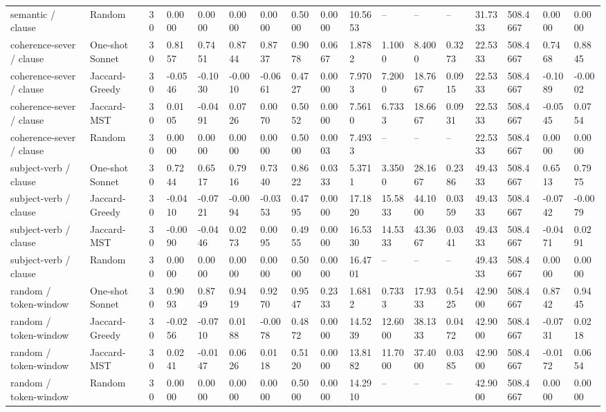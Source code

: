 \begin{table}[t]
{\begin{tabular}{lllllllllllllllll}
semantic / clause & Random & 30 & 0.0000 & 0.0000 & 0.0000 & 0.0000 & 0.5000 & 0.0000 & 10.5653 & -- & -- & -- & 31.7333 & 508.4667 & 0.0000 & 0.0000 \\
coherence-sever / clause & One-shot Sonnet & 30 & 0.8157 & 0.7451 & 0.8744 & 0.8737 & 0.9078 & 0.0667 & 1.8782 & 1.1000 & 8.4000 & 0.3273 & 22.5333 & 508.4667 & 0.7468 & 0.8845 \\
coherence-sever / clause & Jaccard-Greedy & 30 & -0.0546 & -0.1030 & -0.0010 & -0.0661 & 0.4727 & 0.0000 & 7.9703 & 7.2000 & 18.7667 & 0.0915 & 22.5333 & 508.4667 & -0.1089 & -0.0002 \\
coherence-sever / clause & Jaccard-MST & 30 & 0.0105 & -0.0491 & 0.0726 & 0.0070 & 0.5052 & 0.0000 & 7.5610 & 6.7333 & 18.6667 & 0.0931 & 22.5333 & 508.4667 & -0.0545 & 0.0754 \\
coherence-sever / clause & Random & 30 & 0.0000 & 0.0000 & 0.0000 & 0.0000 & 0.5000 & 0.0003 & 7.4933 & -- & -- & -- & 22.5333 & 508.4667 & 0.0000 & 0.0000 \\
subject-verb / clause & One-shot Sonnet & 30 & 0.7244 & 0.6517 & 0.7916 & 0.7340 & 0.8622 & 0.0333 & 5.3711 & 3.3500 & 28.1667 & 0.2386 & 49.4333 & 508.4667 & 0.6513 & 0.7975 \\
subject-verb / clause & Jaccard-Greedy & 30 & -0.0410 & -0.0721 & -0.0094 & -0.0353 & 0.4795 & 0.0000 & 17.1820 & 15.5833 & 44.1000 & 0.0359 & 49.4333 & 508.4667 & -0.0742 & -0.0079 \\
subject-verb / clause & Jaccard-MST & 30 & -0.0090 & -0.0446 & 0.0273 & 0.0095 & 0.4955 & 0.0000 & 16.5330 & 14.5333 & 43.3667 & 0.0341 & 49.4333 & 508.4667 & -0.0471 & 0.0291 \\
subject-verb / clause & Random & 30 & 0.0000 & 0.0000 & 0.0000 & 0.0000 & 0.5000 & 0.0000 & 16.4701 & -- & -- & -- & 49.4333 & 508.4667 & 0.0000 & 0.0000 \\
random / token-window & One-shot Sonnet & 30 & 0.9093 & 0.8749 & 0.9419 & 0.9270 & 0.9547 & 0.2333 & 1.6812 & 0.7333 & 17.9333 & 0.5425 & 42.9000 & 508.4667 & 0.8742 & 0.9445 \\
random / token-window & Jaccard-Greedy & 30 & -0.0256 & -0.0710 & 0.0188 & -0.0078 & 0.4872 & 0.0000 & 14.5239 & 12.6000 & 38.1333 & 0.0472 & 42.9000 & 508.4667 & -0.0731 & 0.0218 \\
random / token-window & Jaccard-MST & 30 & 0.0241 & -0.0147 & 0.0626 & 0.0118 & 0.5120 & 0.0000 & 13.8182 & 11.7000 & 37.4000 & 0.0385 & 42.9000 & 508.4667 & -0.0172 & 0.0654 \\
random / token-window & Random & 30 & 0.0000 & 0.0000 & 0.0000 & 0.0000 & 0.5000 & 0.0000 & 14.2910 & -- & -- & -- & 42.9000 & 508.4667 & 0.0000 & 0.0000 \\

\end{tabular}}
\end{table}
